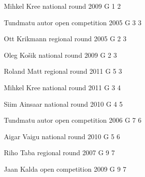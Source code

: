 \documentclass[11pt]{article}
\begin{document}
\ylDisplay{} %
{Mihkel Kree} %
{national round} %
{2009} %
{G 1} %
{2} %
{

\ifEngStatement
\fi
}

\ylDisplay{} %
{Tundmatu autor} %
{open competition} %
{2005} %
{G 3} %
{3} %
{

\ifEngStatement
\fi
}

\ylDisplay{} %
{Ott Krikmann} %
{regional round} %
{2005} %
{G 2} %
{3} %
{

\ifEngStatement
\fi
}

\ylDisplay{} %
{Oleg Košik} %
{national round} %
{2009} %
{G 2} %
{3} %
{

\ifEngStatement
\fi
}

\ylDisplay{} %
{Roland Matt} %
{regional round} %
{2011} %
{G 5} %
{3} %
{

\ifEngStatement
\fi
}

\ylDisplay{} %
{Mihkel Kree} %
{national round} %
{2011} %
{G 3} %
{4} %
{

\ifEngStatement
\fi
}

\ylDisplay{} %
{Siim Ainsaar} %
{national round} %
{2010} %
{G 4} %
{5} %
{

\ifEngStatement
\fi
}

\ylDisplay{} %
{Tundmatu autor} %
{open competition} %
{2006} %
{G 7} %
{6} %
{

\ifEngStatement
\fi
}

\ylDisplay{} %
{Aigar Vaigu} %
{national round} %
{2010} %
{G 5} %
{6} %
{

\ifEngStatement
\fi
}

\ylDisplay{} %
{Riho Taba} %
{regional round} %
{2007} %
{G 9} %
{7} %
{

\ifEngStatement
\fi
}

\ylDisplay{} %
{Jaan Kalda} %
{open competition} %
{2009} %
{G 9} %
{7} %
{

\ifEngStatement
\fi
}
\end{document}
